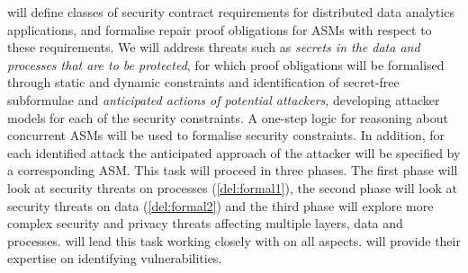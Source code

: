\begin{Workpackage}{\thewpno}
\begin{Task}
\TaskResults{%
\ref{del:formal1},
\ref{del:formal2},
\ref{del:formal3}
}
\TaskHeader{}


\theTask{} will define classes of security contract requirements for distributed data analytics applications, and formalise repair proof obligations for ASMs with respect to these requirements. We will address %
threats such as \emph{secrets in the data and processes that are to be protected}, for which proof obligations will be formalised through static and dynamic constraints and identification of secret-free subformulae and \emph{anticipated actions of potential attackers}, developing attacker models for each of the security constraints. A one-step logic for reasoning about concurrent  ASMs will be used to formalise security constraints. In addition, for each identified attack the anticipated approach of the attacker will be specified by a corresponding ASM. This task will proceed in three phases. The first phase will look at security threats on processes (\ref{del:formal1}), the second phase will look at security threats on data (\ref{del:formal2}) and the third phase will explore more complex security and privacy threats affecting multiple layers, data and processes. \SCCHshort will lead this task working closely with \SA on all aspects. \IBMshort will provide their expertise on identifying vulnerabilities.


\end{Task}
\end{Workpackage}
